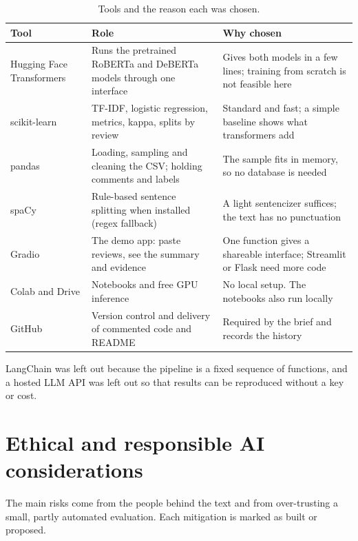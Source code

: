 \documentclass[11pt,a4paper]{article}
\begin{document}
\begin{table}[htb]
\centering
\caption{Tools and the reason each was chosen.}
\label{tab:tools}
\small
\begin{tabularx}{\textwidth}{>{\raggedright\arraybackslash}p{2.7cm}>{\raggedright\arraybackslash}X>{\raggedright\arraybackslash}X}
\toprule
Tool & Role & Why chosen \\
\midrule
Hugging Face Transformers & Runs the pretrained RoBERTa and DeBERTa models through one interface & Gives both models in a few lines; training from scratch is not feasible here \\
scikit-learn & TF-IDF, logistic regression, metrics, kappa, splits by review & Standard and fast; a simple baseline shows what transformers add \\
pandas & Loading, sampling and cleaning the CSV; holding comments and labels & The sample fits in memory, so no database is needed \\
spaCy & Rule-based sentence splitting when installed (regex fallback) & A light sentencizer suffices; the text has no punctuation \\
Gradio & The demo app: paste reviews, see the summary and evidence & One function gives a shareable interface; Streamlit or Flask need more code \\
Colab and Drive & Notebooks and free GPU inference & No local setup. The notebooks also run locally \\
GitHub & Version control and delivery of commented code and README & Required by the brief and records the history \\
\bottomrule
\end{tabularx}
\end{table}

LangChain was left out because the pipeline is a fixed sequence of functions, and a hosted LLM API was left out so that results can be reproduced without a key or cost.

\section{Ethical and responsible AI considerations}\label{sec:ethics}

The main risks come from the people behind the text and from over-trusting a small, partly automated evaluation. Each mitigation is marked as built or proposed.
\end{document}
